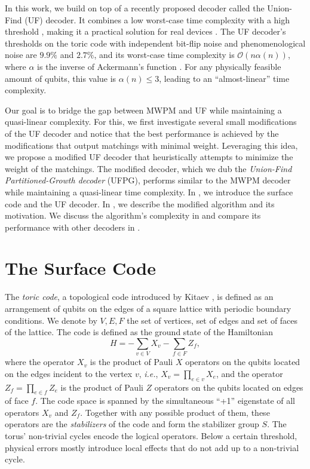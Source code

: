 In this work, we build on top of a recently proposed decoder called the Union-Find (UF) decoder. It combines a low worst-case time complexity with a high threshold \cite{delfosse2017almost}, making it a practical solution for real devices \cite{huang2020fault,delfosse2020hierarchical,das2020scalable}. The UF decoder's thresholds on the toric code with independent bit-flip noise and phenomenological noise are $9.9\%$ and $2.7\%$, and its worst-case time complexity is $\mathcal{O}(n\alpha(n))$, where $\alpha$ is the inverse of Ackermann's function \cite{tarjan1975efficiency}. For any physically feasible amount of qubits, this value is $\alpha(n) \leq 3$, leading to an ``almost-linear'' time complexity. 

Our goal is to bridge the gap between MWPM and UF while maintaining a quasi-linear complexity. For this, we first investigate several small modifications of the UF decoder and notice that the best performance is achieved by the modifications that output matchings with minimal weight. Leveraging this idea, we propose a modified UF decoder that heuristically attempts to minimize the weight of the matchings. The modified decoder, which we dub the \emph{Union-Find Partitioned-Growth decoder} (UFPG), performs similar to the MWPM decoder while maintaining a quasi-linear time complexity. In , we introduce the surface code and the UF decoder. In , we describe the modified algorithm and its motivation. We discuss the algorithm's complexity in  and compare its performance with other decoders in .  

\section{The Surface Code}\label{sec:surfacecode}

The \emph{toric code}, a topological code introduced by Kitaev \cite{kitaev2003fault}, is defined as an arrangement of qubits on the edges of a square lattice with periodic boundary conditions. We denote by $V,E,F$ the set of vertices, set of edges and set of faces of the lattice. The code is defined as the ground state of the Hamiltonian
\begin{equation}
    H = -\sum_{v \in V} X_v -\sum_{f \in F} Z_f, 
\end{equation}
where the operator $X_v$ is the product of Pauli $X$ operators on the qubits located on the edges incident to the vertex $v$, \emph{i.e.}, $X_v = \prod_{e \in v} X_e$, and the operator $Z_f = \prod_{e \in f} Z_e$ is the product of Pauli $Z$ operators on the qubits located on edges of face $f$. The code space is spanned by the simultaneous ``+1'' eigenstate of all operators $X_v$ and $Z_f$. Together with any possible product of them, these operators are the \emph{stabilizers} of the code and form the stabilizer group $S$. The torus' non-trivial cycles encode the logical operators. Below a certain threshold, physical errors mostly introduce local effects that do not add up to a non-trivial cycle. 

